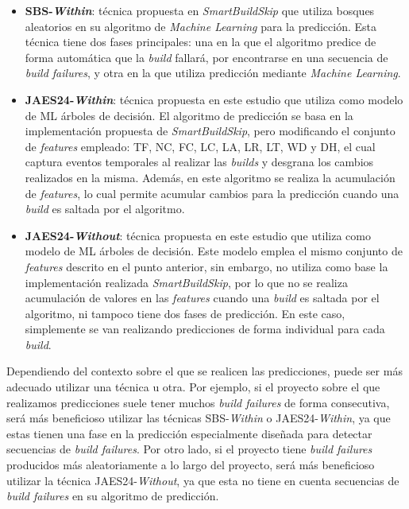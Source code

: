 \begin{itemize}
    \item \textbf{SBS-\textit{Within}}: técnica propuesta en \textit{SmartBuildSkip} que utiliza bosques
    aleatorios en su algoritmo de \textit{Machine Learning} para la predicción. Esta técnica
    tiene dos fases principales: una en la que el algoritmo predice de forma automática que
    la \textit{build} fallará, por encontrarse en una secuencia de \textit{build failures}, y
    otra en la que utiliza predicción mediante \textit{Machine Learning}.\\

    \item \textbf{JAES24-\textit{Within}}: técnica propuesta en este estudio que utiliza como modelo de
    ML árboles de decisión. El algoritmo de predicción se basa en la implementación propuesta de
    \textit{SmartBuildSkip}, pero modificando el conjunto de \textit{features} empleado: TF, NC,
    FC, LC, LA, LR, LT, WD y DH, el cual captura eventos temporales al realizar las \textit{builds}
    y desgrana los cambios realizados en la misma. Además, en este algoritmo se realiza la
    acumulación de \textit{features}, lo cual permite acumular cambios para la predicción cuando
    una \textit{build} es saltada por el algoritmo.\\
    
    \item \textbf{JAES24-\textit{Without}}: técnica propuesta en este estudio que utiliza como modelo de
    ML árboles de decisión. Este modelo emplea el mismo conjunto de \textit{features} descrito en
    el punto anterior, sin embargo, no utiliza como base la implementación realizada
    \textit{SmartBuildSkip}, por lo que no se realiza acumulación de valores en las \textit{features}
    cuando una \textit{build} es saltada por el algoritmo, ni tampoco tiene dos fases de predicción.
    En este caso, simplemente se van realizando predicciones de forma individual para cada
    \textit{build}.
\end{itemize}

Dependiendo del contexto sobre el que se realicen las predicciones, puede ser más adecuado
utilizar una técnica u otra. Por ejemplo, si el proyecto sobre el que realizamos predicciones
suele tener muchos \textit{build failures} de forma consecutiva, será más beneficioso utilizar
las técnicas SBS-\textit{Within} o JAES24-\textit{Within}, ya que estas tienen una fase
en la predicción especialmente diseñada para detectar secuencias de \textit{build failures}. Por
otro lado, si el proyecto tiene \textit{build failures} producidos más aleatoriamente a lo largo
del proyecto, será más beneficioso utilizar la técnica JAES24-\textit{Without}, ya que esta no 
tiene en cuenta secuencias de \textit{build failures} en su algoritmo de predicción.\\

